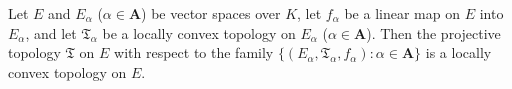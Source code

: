 Let $E$ and $E_\alpha$ ($\alpha \in \mathbf{A}$) be vector spaces over $K$, let $f_\alpha$ be a linear map on $E$ into $E_\alpha$, and let $\mathfrak{T}_\alpha$ be a locally convex topology on $E_\alpha$ ($\alpha \in \mathbf{A}$). Then the projective topology $\mathfrak{T}$ on $E$ with respect to the family $\{(E_\alpha, \mathfrak{T}_\alpha, f_\alpha): \alpha \in \mathbf{A}\}$ is a locally convex topology on $E$.
